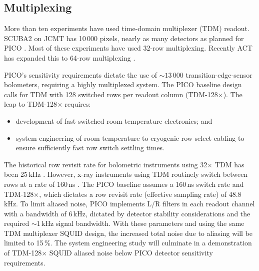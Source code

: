 \subsection{Multiplexing}
\label{sec:multiplexing}

More than ten experiments have used time-domain multiplexer (TDM)
readout. SCUBA2 on JCMT has 10\,000 pixels, nearly as many detectors
as planned for PICO \citep{Holland2013}. Most of these experiments
have used 32-row multiplexing. Recently ACT has expanded this to
64-row multiplexing \citep{Henderson2016}.

PICO's sensitivity requirements dictate the use of $\sim 13\,000$
transition-edge-sensor bolometers, requiring a highly multiplexed
system.  The PICO baseline design calls for TDM
with 128 switched rows per readout column (TDM-128$\times$). The leap
to TDM-128$\times$ requires:
\begin{itemize}
\item development of fast-switched room temperature electronics; and
\item system engineering of room temperature to cryogenic row select cabling to ensure sufficiently fast row switch settling times.
\end{itemize}

The historical row revisit rate for bolometric instruments using
32$\times$ TDM has been 25\,kHz \cite[e.g.,][]{BICEP2015}. However,
x-ray instruments using TDM routinely switch between rows at a rate of
160\,ns \citep{Doriese2016}. The PICO baseline assumes a 160\,ns
switch rate and TDM-128$\times$, which dictates a row revisit rate
(effective sampling rate) of 48.8\,kHz. To limit aliased noise, PICO
implements L/R filters in each readout channel with a bandwidth of
6\,kHz, dictated by detector stability considerations and the required
$\sim1$\,kHz signal bandwidth.  With these parameters and using the
same TDM multiplexer SQUID design, the increased total noise due to
aliasing will be limited to 15\,\%.  The system engineering study will
culminate in a demonstration of TDM-128$\times$ SQUID aliased noise
below PICO detector sensitivity requirements.





